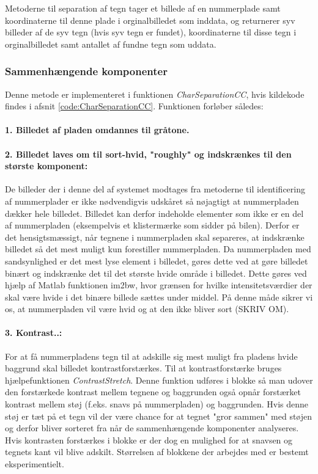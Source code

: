 Metoderne til separation af tegn tager et billede af en nummerplade samt koordinaterne til denne plade i orginalbilledet som inddata, og returnerer syv billeder af de syv tegn (hvis syv tegn er fundet), koordinaterne til disse tegn i orginalbilledet samt antallet af fundne tegn som uddata.

\subsubsection*{Sammenhængende komponenter}

Denne metode er implementeret i funktionen \textit{CharSeparationCC}, hvis kildekode findes i afsnit \vref{code:CharSeparationCC}. Funktionen forløber således:

\paragraph{1. Billedet af pladen omdannes til gråtone.}

\paragraph{2. Billedet laves om til sort-hvid, "roughly" og indskrænkes til den største komponent:}
De billeder der i denne del af systemet modtages fra metoderne til identificering af nummerplader er ikke nødvendigvis udskåret så nøjagtigt at nummerpladen dækker hele billedet. Billedet kan derfor indeholde elementer som ikke er en del af nummerpladen (eksempelvis et klistermærke som sidder på bilen). Derfor er det hensigtsmæssigt, når tegnene i nummerpladen skal separeres, at indskrænke billedet så det mest muligt kun forestiller nummerpladen. Da nummerpladen med sandsynlighed er det mest lyse element i billedet, gøres dette ved at gøre billedet binært og indskrænke det til det største hvide område i billedet. Dette gøres ved hjælp af Matlab funktionen im2bw, hvor grænsen for hvilke intensitetsværdier der skal være hvide i det binære billede sættes under middel. På denne måde sikrer vi os, at nummerpladen vil være hvid og at den ikke bliver sort (SKRIV OM).

\paragraph{3. Kontrast..:}
For at få nummerpladens tegn til at adskille sig mest muligt fra pladens hvide baggrund skal billedet kontrastforstærkes. Til at kontrastforstærke bruges hjælpefunktionen \textit{ContrastStretch}. Denne funktion udføres i blokke så man udover den forstærkede kontrast mellem tegnene og baggrunden også opnår forstærket kontrast mellem støj (f.eks. snavs på nummerpladen) og baggrunden. Hvis denne støj er tæt på et tegn vil der være chance for at tegnet "gror sammen" med støjen og derfor bliver sorteret fra når de sammenhængende komponenter analyseres. Hvis kontrasten forstærkes i blokke er der dog en mulighed for at snavsen og tegnets kant vil blive adskilt. Størrelsen af blokkene der arbejdes med er bestemt eksperimentielt.

